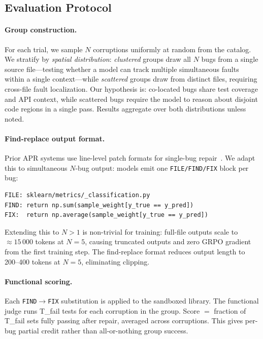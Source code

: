 \documentclass[12pt]{article}
\begin{document}
\subsection{Evaluation Protocol}

\paragraph{Group construction.}
For each trial, we sample $N$ corruptions uniformly at random from the catalog.
We stratify by \emph{spatial distribution}: \emph{clustered} groups draw all
$N$ bugs from a single source file---testing whether a model can track multiple
simultaneous faults within a single context---while \emph{scattered} groups draw
from distinct files, requiring cross-file fault localization. Our hypothesis is: co-located bugs share test coverage and API context, while scattered
bugs require the model to reason about disjoint code regions in a single pass.
Results aggregate over both distributions unless noted.

\paragraph{Find-replace output format.}
Prior APR systems use line-level patch formats for single-bug
repair~\cite{xia2024chatrepair,ye2022selfapr}. We adapt this to simultaneous
$N$-bug output: models emit one \texttt{FILE/FIND/FIX} block per bug:

\begin{lstlisting}[basicstyle=\small\ttfamily, frame=single]
FILE: sklearn/metrics/_classification.py
FIND: return np.sum(sample_weight[y_true == y_pred])
FIX:  return np.average(sample_weight[y_true == y_pred])
\end{lstlisting}

Extending this to $N{>}1$ is non-trivial for training: full-file outputs scale
to ${\approx}15\,000$ tokens at $N{=}5$, causing truncated outputs
and zero GRPO gradient from the first training step. The find-replace format
reduces output length to 200--400 tokens at $N{=}5$, eliminating clipping.


\paragraph{Functional scoring.}
Each \texttt{FIND$\to$FIX} substitution is applied to the sandboxed library.
The functional judge runs T\_fail tests for each corruption in the group.
Score $=$ fraction of T\_fail sets fully passing after repair, averaged across
corruptions. This gives per-bug partial credit rather than all-or-nothing
group success.
\end{document}
